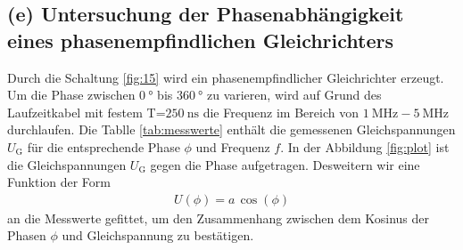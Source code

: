 \FloatBarrier
\subsection{(e) Untersuchung der Phasenabhängigkeit eines
phasenempfindlichen Gleichrichters}
\label{subsec:auswertung_e}
Durch die Schaltung \ref{fig:15} wird ein phasenempfindlicher
Gleichrichter erzeugt. Um die Phase \phi zwischen
$\SI{0}{\degree}$ bis $\SI{360}{\degree}$ zu varieren, wird
auf Grund des Laufzeitkabel mit festem T=$\SI{250}{\nano\second}$
die Frequenz im Bereich von $\SI{1}{\mega\hertz}-\SI{5}{\mega\hertz}$
durchlaufen. Die Tablle \ref{tab:messwerte} enthält die gemessenen
Gleichspannungen $U_{\text{G}}$ für die entsprechende Phase $\phi$ und Frequenz $f$.
In der Abbildung \ref{fig:plot} ist die Gleichspannungen $U_{\text{G}}$
gegen die Phase aufgetragen.
Desweitern wir eine Funktion der Form
\begin{align}
  U(\phi)=a \, \cos(\phi)
\end{align}
an die Messwerte gefittet,
um den Zusammenhang zwischen dem Kosinus der
Phasen $\phi$ und Gleichspannung zu bestätigen.
\
